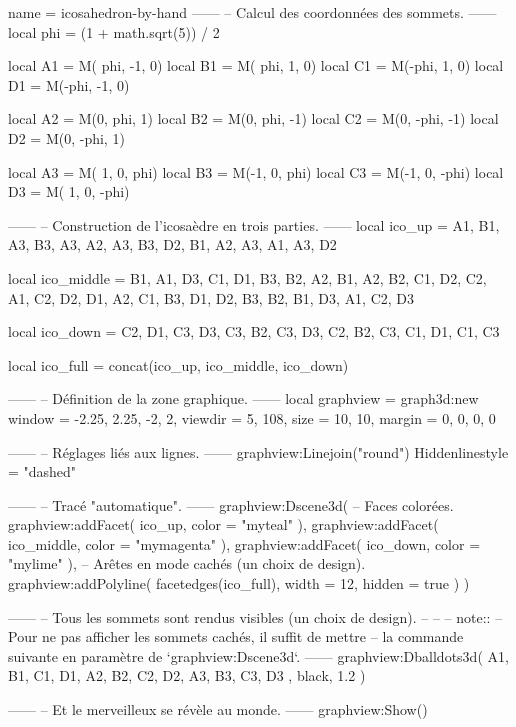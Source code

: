\documentclass[border = 3pt]{standalone}
\begin{document}
\begin{luadraw}{name = icosahedron-by-hand}
------
-- Calcul des coordonnées des sommets.
------
local phi = (1 + math.sqrt(5)) / 2

local A1 = M( phi, -1, 0)
local B1 = M( phi,  1, 0)
local C1 = M(-phi,  1, 0)
local D1 = M(-phi, -1, 0)

local A2 = M(0,  phi,  1)
local B2 = M(0,  phi, -1)
local C2 = M(0, -phi, -1)
local D2 = M(0, -phi,  1)

local A3 = M( 1, 0,  phi)
local B3 = M(-1, 0,  phi)
local C3 = M(-1, 0, -phi)
local D3 = M( 1, 0, -phi)

------
-- Construction de l'icosaèdre en trois parties.
------
local ico_up = {
  {A1, B1, A3},
  {B3, A3, A2},
  {A3, B3, D2},
  {B1, A2, A3},
  {A1, A3, D2}
}

local ico_middle = {
  {B1, A1, D3},
  {C1, D1, B3},
  {B2, A2, B1},
  {A2, B2, C1},
  {D2, C2, A1},
  {C2, D2, D1},
  {A2, C1, B3},
  {D1, D2, B3},
  {B2, B1, D3},
  {A1, C2, D3}
}

local ico_down = {
  {C2, D1, C3},
  {D3, C3, B2},
  {C3, D3, C2},
  {B2, C3, C1},
  {D1, C1, C3}
}

local ico_full = concat(ico_up, ico_middle, ico_down)

------
-- Définition de la zone graphique.
------
local graphview = graph3d:new{
    window  = {-2.25, 2.25, -2, 2},
    viewdir = {5, 108},
    size    = {10, 10},
    margin  = {0, 0, 0, 0}
}

------
-- Réglages liés aux lignes.
------
graphview:Linejoin("round")
Hiddenlinestyle = "dashed"

------
-- Tracé "automatique".
------
graphview:Dscene3d(
-- Faces colorées.
    graphview:addFacet(
      ico_up,
      {
        color = "myteal"
      }),
    graphview:addFacet(
      ico_middle,
      {
        color = "mymagenta"
      }),
    graphview:addFacet(
      ico_down,
      {
        color = "mylime"
      }),
-- Arêtes en mode cachés (un choix de design).
    graphview:addPolyline(
      facetedges(ico_full),
      {
        width = 12,
        hidden = true
      })
)

------
-- Tous les sommets sont rendus visibles (un choix de design).
--
--
-- note::
--     Pour ne pas afficher les sommets cachés, il suffit de mettre
--     la commande suivante en paramètre de `graphview:Dscene3d`.
------
graphview:Dballdots3d(
  {
    A1, B1, C1, D1,
    A2, B2, C2, D2,
    A3, B3, C3, D3
  },
  black,
  1.2
)

------
-- Et le merveilleux se révèle au monde.
------
graphview:Show()
\end{luadraw}
\end{document}
